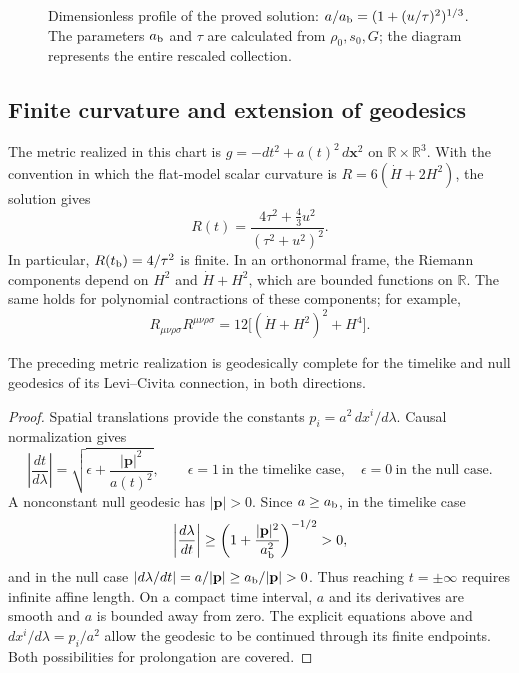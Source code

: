 \begin{figure}[htbp]
\centering
{}
\caption{Dimensionless profile of the proved solution:
\(a/a_{\rm b}=(1+(u/\tau)^2)^{1/3}\).
The parameters \(a_{\rm b}\) and \(\tau\) are calculated from
\(\rho_0,s_0,G\); the diagram represents the entire rescaled collection.}
\label{vii:fig:rebote-polvo}
\end{figure}

\subsection{Finite curvature and extension of geodesics}
The metric realized in this chart is
\(g=-dt^2+a(t)^2\,d\mathbf x^2\) on
\(\mathbb R\times\mathbb R^3\). With the convention in which
the flat-model scalar curvature is \(R=6(\dot H+2H^2)\), the solution gives
\[
 R(t)=\frac{4\tau^2+\frac43u^2}{(\tau^2+u^2)^2}.
\]
In particular, \(R(t_{\rm b})=4/\tau^2\) is finite.
In an orthonormal frame, the Riemann components depend on
\(H^2\) and \(\dot H+H^2\), which are bounded functions on
\(\mathbb R\). The same holds for polynomial contractions of
these components; for example,
\[
 R_{\mu\nu\rho\sigma}R^{\mu\nu\rho\sigma}
 =12\bigl[(\dot H+H^2)^2+H^4\bigr].
\]

\begin{proposition}
\label{vii:prop:completitud-causal-polvo}
The preceding metric realization is geodesically complete
for the timelike and null geodesics of its Levi--Civita
connection, in both directions.
\end{proposition}
\begin{proof}
Spatial translations provide the constants
\(p_i=a^2\,dx^i/d\lambda\). Causal normalization gives
\[
 \left|\frac{dt}{d\lambda}\right|
 =\sqrt{\epsilon+\frac{|\mathbf p|^2}{a(t)^2}},
 \qquad \epsilon=1\ \text{in the timelike case},\quad
 \epsilon=0\ \text{in the null case}.
\]
A nonconstant null geodesic has \(|\mathbf p|>0\).
Since \(a\geq a_{\rm b}\), in the timelike case
\[
 \left|\frac{d\lambda}{dt}\right|
 \geq\left(1+\frac{|\mathbf p|^2}{a_{\rm b}^2}\right)^{-1/2}>0,
\]
and in the null case
\(\left|d\lambda/dt\right|=a/|\mathbf p|
 \geq a_{\rm b}/|\mathbf p|>0\).
Thus reaching \(t=\pm\infty\) requires infinite affine length.
On a compact time interval, \(a\) and its derivatives are
smooth and \(a\) is bounded away from zero. The explicit equations
above and \(dx^i/d\lambda=p_i/a^2\) allow the geodesic to be
continued through its finite endpoints. Both possibilities
for prolongation are covered.
\end{proof}

